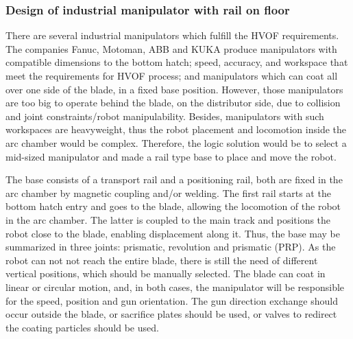 \subsubsection{Design of industrial manipulator with rail on
floor}\label{proj_manip}

There are several industrial manipulators which fulfill the HVOF requirements.
The companies Fanuc, Motoman, ABB and KUKA produce manipulators with compatible
dimensions to the bottom hatch; speed, accuracy, and workspace that meet the
requirements for HVOF process; and manipulators which can coat all over one side
of the blade, in a fixed base position. However, those manipulators are too big
to operate behind the blade, on the distributor side, due to collision and
joint constraints/robot manipulability. Besides, manipulators with such workspaces are
heavyweight, thus the robot placement and locomotion inside the arc chamber
would be complex. Therefore, the logic solution would be to select a mid-sized
manipulator and made a rail type base to place and move the robot. 


The base consists of a transport rail and a positioning rail, both are fixed
in the arc chamber by magnetic coupling and/or welding. The first rail starts at
the bottom hatch entry and goes to the blade, allowing the locomotion of the
robot in the arc chamber. The latter is coupled to the main track and positions
the robot close to the blade, enabling displacement along it. Thus, the
base may be summarized in three joints: prismatic, revolution and prismatic (PRP). As the robot
can not not reach the entire blade, there is still the need of different
vertical positions, which should be manually selected. The blade can coat in
linear or circular motion, and, in both cases, the manipulator will be
responsible for the speed, position and gun orientation. The gun direction
exchange should occur outside the blade, or sacrifice plates should be used, or
valves to redirect the coating particles should be used.

